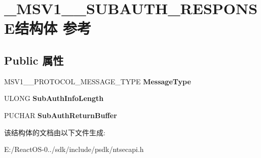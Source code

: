 \hypertarget{struct___m_s_v1__0___s_u_b_a_u_t_h___r_e_s_p_o_n_s_e}{}\section{\+\_\+\+M\+S\+V1\+\_\+\_\+\+S\+U\+B\+A\+U\+T\+H\+\_\+\+R\+E\+S\+P\+O\+N\+S\+E结构体 参考}
\label{struct___m_s_v1__0___s_u_b_a_u_t_h___r_e_s_p_o_n_s_e}
\subsection*{Public 属性}
\begin{DoxyCompactItemize}
\item 
\mbox{\label{struct___m_s_v1__0___s_u_b_a_u_t_h___r_e_s_p_o_n_s_e_a15704559576632e503bf9dff36b64e8d}} 
M\+S\+V1\+\_\+\_\+\+P\+R\+O\+T\+O\+C\+O\+L\+\_\+\+M\+E\+S\+S\+A\+G\+E\+\_\+\+T\+Y\+PE {\bfseries Message\+Type}
\item 
\mbox{\label{struct___m_s_v1__0___s_u_b_a_u_t_h___r_e_s_p_o_n_s_e_a4c1e4d4789e186bda960375b1db9b11e}} 
U\+L\+O\+NG {\bfseries Sub\+Auth\+Info\+Length}
\item 
\mbox{\label{struct___m_s_v1__0___s_u_b_a_u_t_h___r_e_s_p_o_n_s_e_ad3923a41d960f6b4303e7e698a16d193}} 
P\+U\+C\+H\+AR {\bfseries Sub\+Auth\+Return\+Buffer}
\end{DoxyCompactItemize}


该结构体的文档由以下文件生成\+:\begin{DoxyCompactItemize}
\item 
E\+:/\+React\+O\+S-\/0../sdk/include/psdk/ntsecapi.\+h\end{DoxyCompactItemize}

